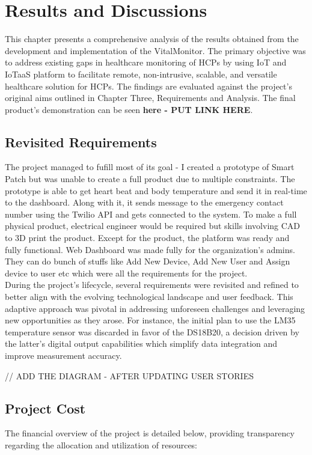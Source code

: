 \chapter{Results and Discussions}

This chapter presents a comprehensive analysis of the results obtained from the development and implementation of the VitalMonitor. The primary objective was to address existing gaps in healthcare monitoring of HCPs by using IoT and IoTaaS platform to facilitate remote, non-intrusive, scalable, and versatile healthcare solution for HCPs. The findings are evaluated against the project's original aims outlined in Chapter Three, Requirements and Analysis. The final product's demonstration can be seen \textbf{here - PUT LINK HERE}.

\section{Revisited Requirements}
The project managed to fufill most of its goal - I created a prototype of Smart Patch but was unable to create a full product due to multiple constraints. The prototype is able to get heart beat and body temperature and send it in real-time to the dashboard. Along with it, it sends message to the emergency contact number using the Twilio API and gets connected to the system.  To make a full physical product, electrical engineer would be required but skills involving CAD to 3D print the product. Except for the product, the platform was ready and fully functional. Web Dashboard was made fully for the organization's admins. They can do bunch of stuffs like Add New Device, Add New User and Assign device to user etc which were all the requirements for the project. \\

During the project's lifecycle, several requirements were revisited and refined to better align with the evolving technological landscape and user feedback. This adaptive approach was pivotal in addressing unforeseen challenges and leveraging new opportunities as they arose. For instance, the initial plan to use the LM35 temperature sensor was discarded in favor of the DS18B20, a decision driven by the latter's digital output capabilities which simplify data integration and improve measurement accuracy.

// ADD THE DIAGRAM - AFTER UPDATING USER STORIES

\section{Project Cost}
The financial overview of the project is detailed below, providing transparency regarding the allocation and utilization of resources:

